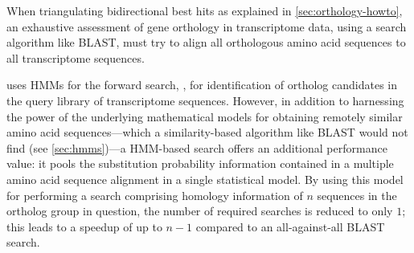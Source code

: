 When triangulating bidirectional best hits as explained in
\autoref{sec:orthology-howto}, an exhaustive assessment of gene orthology in
transcriptome data, using a search algorithm like BLAST, must try to align all
orthologous amino acid sequences to all transcriptome sequences.  

\pname uses HMMs for the forward search, \ie, for identification of ortholog
candidates in the query library of transcriptome sequences. However, in addition
to harnessing the power of the underlying mathematical models for obtaining
remotely similar amino acid sequences---which a similarity-based algorithm like
BLAST would not find (see \autoref{sec:hmms})---a HMM-based search offers an
additional performance value: it pools the substitution probability information
contained in a multiple amino acid sequence alignment in a single statistical
model. By using this model for performing a search comprising homology
information of $n$ sequences in the ortholog group in question, the number of
required searches is reduced to only $1$; this leads to a speedup of up to $n-1$
compared to an all-against-all BLAST search.

